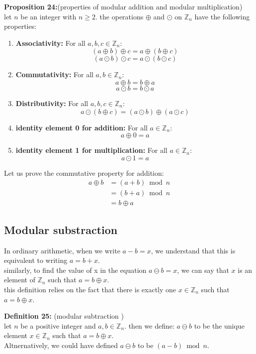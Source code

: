 \documentclass[12pt]{article}
\begin{document}
\vspace{5mm}
\noindent\textbf{Proposition 24:}(properties of modular addition and modular multiplication)
\\ let $n$ be an integer with $n \ge 2$. the operations $\oplus$ and $\odot$ on $\mathbb{Z}_n$ have the following properties:
    
\begin{enumerate}[label=(\alph*)]
    \item \textbf{Associativity:} For all $a,b,c \in \mathbb{Z}_n$:
    \[
    (a \oplus b) \oplus c = a \oplus (b \oplus c)
    \]
    \[
    (a \odot b) \odot c = a \odot (b \odot c)
    \]
    \item \textbf{Commutativity:} For all $a,b \in \mathbb{Z}_n$:
    \[
    a \oplus b = b \oplus a
    \]
    \[
    a \odot b = b \odot a
    \]
    \item \textbf{Distributivity:} For all $a,b,c \in \mathbb{Z}_n$:
    \[
    a \odot (b \oplus c) = (a \odot b) \oplus (a \odot c)
    \]
    \item \textbf{identity element 0 for addition:} For all $a \in \mathbb{Z}_n$:
    \[
    a \oplus 0 = a
    \]
    \item \textbf{identity element 1 for multiplication:} For all $a \in \mathbb{Z}_n$:
    \[
    a \odot 1 = a
    \]
\end{enumerate}
Let us prove the commutative property for addition:
\begin{align*}
a \oplus b &= (a + b) \bmod n \\
&= (b + a) \bmod n \\
&= b \oplus a
\end{align*}


\subsection{Modular substraction}
In ordinary arithmetic, when we write $a-b=x$, we understand that this is equivalent to writing $a=b+x$. 
\\similarly, to find the value of x in the equation $a \ominus b = x$, we can say that $x$ is an element of $\mathbb{Z}_n$ such that $a = b \oplus x$.
\\this definition relies on the fact that there is exactly one $x \in \mathbb{Z}_n$ such that $a = b \oplus x$.

\vspace{5mm}
\noindent\textbf{Definition 25:} (modular subtraction )
\\ let $n$ be a positive integer and $a,b \in \mathbb{Z}_n$. then we define: $a \ominus b$ to be the unique element $x \in \mathbb{Z}_n$ such that $a = b \oplus x$.
\\ Altnernatively, we could have defined $a \ominus b$ to be $(a-b) \bmod n$.
\end{document}
